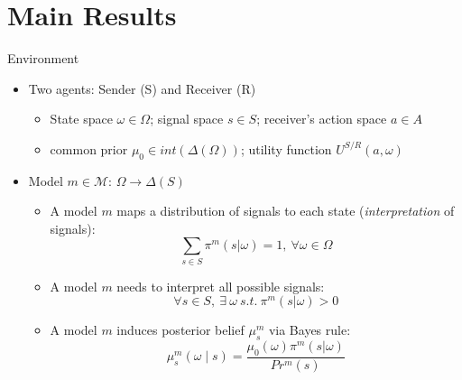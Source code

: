 \documentclass[aspectratio=169]{beamer}
\theoremstyle{definition}
\theoremstyle{plain}
\theoremstyle{plain}
\theoremstyle{definition}
\theoremstyle{plain}
\theoremstyle{plain}
\theoremstyle{plain}
\theoremstyle{plain}
\theoremstyle{remark}
\theoremstyle{definition}
\begin{document}
\section{Main Results}

\begin{frame}[label=EN1]{Environment}
    \begin{itemize}
        \item Two agents: Sender (S) and Receiver (R)
        \smallskip
        \begin{itemize}
            \item State space \( \omega \in \Omega \); signal space \( s \in S \); receiver's action space \( a \in A\)
            \item  common prior \(\mu_0 \in int(\Delta(\Omega))\); utility function \( U^{S/R} (a, \omega) \)
        \end{itemize}
        \bigskip
        \item Model \( m \in \mathcal{M} \): \( \Omega \rightarrow \Delta(S) \)
        \smallskip
        \begin{itemize}
            \item A model \( m \) maps a distribution of signals to each state (\textit{interpretation} of signals): \[ \sum_{s \in S} \pi^m(s|\omega) = 1, \ \forall \omega \in \Omega \]
            \item A model \( m \) needs to interpret all possible signals: \[ \forall s \in S, \ \exists \ \omega \ s.t. \ \pi^m(s|\omega) > 0 \]
            \item A model \( m \) induces posterior belief \( \mu^m_s \) via Bayes rule: 
            \[\mu^m_s(\omega\mid s) = \frac{\mu_0(\omega) \pi^m(s|\omega)}{Pr^m(s)}\]
        \end{itemize}
    \end{itemize}
\end{frame}
\end{document}
